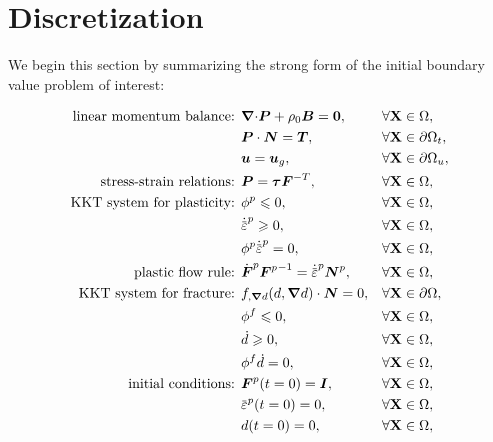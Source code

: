 \section{Discretization}
\label{section: framework/discretization}

We begin this section by summarizing the strong form of the initial boundary value problem of interest:
\begin{mdframed}[
    frametitle={The initial boundary value problem},
    frametitlebackgroundcolor=gray!20,
    backgroundcolor=gray!5,
    linewidth=0pt,
    nobreak=true
  ]
  \begin{align*}
    \text{linear momentum balance: }   & \divergence \bfP + \rho_0 \bfB = \bs{0},            &  & \forall \btX \in \body,           \\
                                       & \bfP \cdot \bfN = \bfT,                             &  & \forall \btX \in \bodyboundary_t, \\
                                       & \bfu = \bfu_g,                                      &  & \forall \btX \in \bodyboundary_u, \\
    \text{stress-strain relations: }   & \bfP = \bs{\tau}\defgrad^{-T},                      &  & \forall \btX \in \body,           \\
    \text{KKT system for plasticity: } & \phi^p \leqslant 0,                                 &  & \forall \btX \in \body,           \\
                                       & \epdot \geqslant 0,                                 &  & \forall \btX \in \body,           \\
                                       & \phi^p \epdot = 0,                                  &  & \forall \btX \in \body,           \\
    \text{plastic flow rule: }         & \dot{\defgrad}^p {\defgrad^p}^{-1} = \epdot \bfN^p, &  & \forall \btX \in \body,           \\
    \text{KKT system for fracture: }   & f_{, \grad d}(d, \grad d) \cdot \bfN = 0 ,          &  & \forall \btX \in \bodyboundary,   \\
                                       & \phi^f \leqslant 0,                                 &  & \forall \btX \in \body,           \\
                                       & \dot{d} \geqslant 0,                                &  & \forall \btX \in \body,           \\
                                       & \phi^f \dot{d} = 0,                                 &  & \forall \btX \in \body,           \\
    \text{initial conditions: }        & \defgrad^p(t=0) = \bfI,                             &  & \forall \btX \in \body,           \\
                                       & \ep(t=0) = 0,                                       &  & \forall \btX \in \body,           \\
                                       & d(t=0) = 0,                                         &  & \forall \btX \in \body,
  \end{align*}
\end{mdframed}
